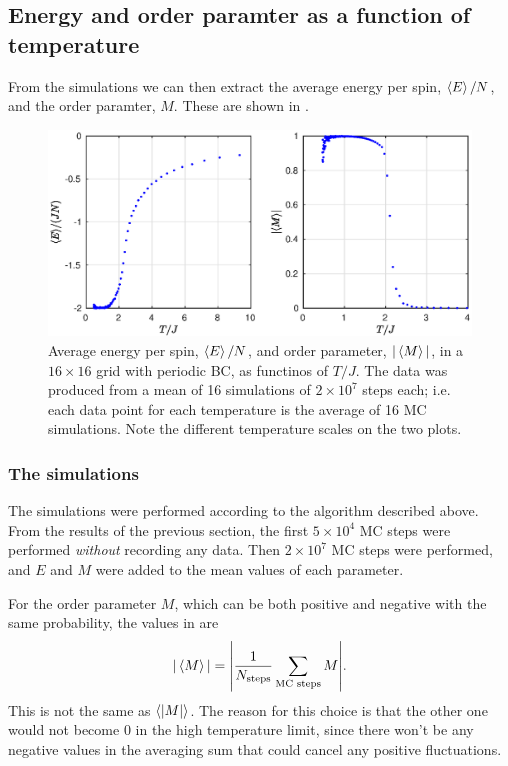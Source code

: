 \documentclass[11pt,letter, swedish, english
]{article}
\begin{document}
\subsection{Energy and order paramter as a function of temperature}
From the simulations we can then extract the average energy per spin,
$\ev{E}/N$, and the order paramter, $M$. These are shown in
. 

\begin{figure}
\centering
\includegraphics[width=1\textwidth]{EM_L-16_Nsteps-2048_Nmean-16.eps}
\caption{Average energy per spin, $\ev{E}/N$, and order parameter,
  $|\ev{M}|$, in a $16\times16$ grid with periodic BC, as functinos of
  $T/J$. The data was produced from a mean of 16 simulations of
  $2\times10^7$ steps each; i.e. each data point for each temperature
  is the average of 16 MC simulations. Note the different temperature
  scales on the two plots.} 
\label{fig:EM1}
\end{figure}


\subsubsection{The simulations}
The simulations were performed according to the algorithm described
above. From the results of the previous section, the first
$5\times10^4$ MC steps were performed \emph{without} recording any
data. Then $2\times10^7$ MC steps were performed, and $E$ and $M$ were
added to the mean values of each parameter.

For the order parameter $M$, which can be both positive and negative with
the same probability, the values in  are
\begin{equation}\label{eq:evM}
|\ev{M}| = \abs{\frac{1}{N_\text{steps}} \sum_{\text{MC steps}} M}.
\end{equation}
This is not the same as $\ev{|M|}$. The reason for this choice is that
the other one would not become $0$ in the high temperature limit,
since there won't be any negative values in the averaging sum that
could cancel any positive fluctuations. 
\end{document}
